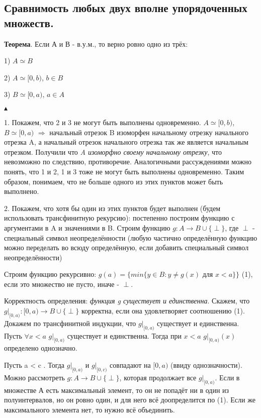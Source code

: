 \subsection{Сравнимость любых двух вполне упорядоченных множеств.}
\textbf{Теорема}. Если А и В - в.у.м., то верно ровно одно из трёх:

1)  $A \simeq B$
	
2) $A \simeq [0, b)$, $b \in B$
	
3) $B \simeq [0, a)$, $a \in A$

$\blacktriangle$

1. Покажем, что 2 и 3 не могут быть выполнены одновременно. $A \simeq [0, b)$, $B \simeq [0, a)$  $\Rightarrow$ начальный отрезок B изоморфен начальному отрезку начального отрезка A, а начальный отрезок начального отрезка так же является начальным отрезком. Получили что \emph{A изоморфно своему начальному отрезку}, что невозможно по следствию, противоречие. Аналогичными рассуждениями можно понять, что 1 и 2, 1 и 3 тоже не могут быть выполнены одновременно. 
Таким образом, понимаем, что не больше одного из этих пунктов может быть выполнено. 

2. Покажем, что хотя бы один из этих пунктов будет выполнен (будем использовать трансфинитную рекурсию): постепенно построим функцию с аргументами в A и значениями в B. Строим функцию $g: A  \rightarrow B \cup\{\perp\}$, где $\perp$ - специальный символ неопределённости (любую частично определённую функцию можно переделать во всюду определённую, если добавить специальный символ неопределённости)

Строим функцию рекурсивно:
$g(a) = \{min\{y \in B: y \neq g(x)$ для $x < a \}\}$ (1), если это множество не пусто, иначе - $\perp$.

Корректность определения: \emph{функция g  существует и единственна}.
Скажем, что $g|_{[0, a)}: [0,a) \rightarrow B\cup\{\perp\}$ корректна, если она удовлетворяет соотношению (1). Докажем по трансфинитной индукции, что $g|_{[0, a)}$ существует и единственна. Пусть $\forall x < a$ $g|_{[0, a)}$ существует и единственна. Тогда при $x < a$  $g|_{[0, a)}(x)$ определено однозначно. 

Пусть a < c . Тогда $g|_{[0, a)}$ и $g|_{[0, c)}$ совпадают на $[0, a)$ (ввиду однозначности). Можно рассмотреть $g: A  \rightarrow B \cup\{\perp\}$, которая продолжает все $g|_{[0, a)}$. Если в множестве А есть максимальный элемент, то он не попадёт ни в один из полуинтервалов, но он ровно один, и для него всё доопределится по (1). Если же максимального элемента нет, то нужно всё объединить.

